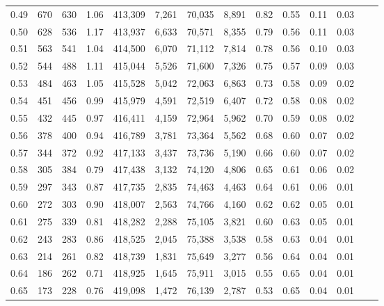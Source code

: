 \begin{tabular}{rrrrrrrrrrrrrr}
0.49 &     670 &    630 &    1.06 &  413,309 &    7,261 &  70,035 &   8,891 &  0.82 &  0.55 &  0.11 &      0.03 \\
0.50 &     628 &    536 &    1.17 &  413,937 &    6,633 &  70,571 &   8,355 &  0.79 &  0.56 &  0.11 &      0.03 \\
0.51 &     563 &    541 &    1.04 &  414,500 &    6,070 &  71,112 &   7,814 &  0.78 &  0.56 &  0.10 &      0.03 \\
0.52 &     544 &    488 &    1.11 &  415,044 &    5,526 &  71,600 &   7,326 &  0.75 &  0.57 &  0.09 &      0.03 \\
0.53 &     484 &    463 &    1.05 &  415,528 &    5,042 &  72,063 &   6,863 &  0.73 &  0.58 &  0.09 &      0.02 \\
0.54 &     451 &    456 &    0.99 &  415,979 &    4,591 &  72,519 &   6,407 &  0.72 &  0.58 &  0.08 &      0.02 \\
0.55 &     432 &    445 &    0.97 &  416,411 &    4,159 &  72,964 &   5,962 &  0.70 &  0.59 &  0.08 &      0.02 \\
0.56 &     378 &    400 &    0.94 &  416,789 &    3,781 &  73,364 &   5,562 &  0.68 &  0.60 &  0.07 &      0.02 \\
0.57 &     344 &    372 &    0.92 &  417,133 &    3,437 &  73,736 &   5,190 &  0.66 &  0.60 &  0.07 &      0.02 \\
0.58 &     305 &    384 &    0.79 &  417,438 &    3,132 &  74,120 &   4,806 &  0.65 &  0.61 &  0.06 &      0.02 \\
0.59 &     297 &    343 &    0.87 &  417,735 &    2,835 &  74,463 &   4,463 &  0.64 &  0.61 &  0.06 &      0.01 \\
0.60 &     272 &    303 &    0.90 &  418,007 &    2,563 &  74,766 &   4,160 &  0.62 &  0.62 &  0.05 &      0.01 \\
0.61 &     275 &    339 &    0.81 &  418,282 &    2,288 &  75,105 &   3,821 &  0.60 &  0.63 &  0.05 &      0.01 \\
0.62 &     243 &    283 &    0.86 &  418,525 &    2,045 &  75,388 &   3,538 &  0.58 &  0.63 &  0.04 &      0.01 \\
0.63 &     214 &    261 &    0.82 &  418,739 &    1,831 &  75,649 &   3,277 &  0.56 &  0.64 &  0.04 &      0.01 \\
0.64 &     186 &    262 &    0.71 &  418,925 &    1,645 &  75,911 &   3,015 &  0.55 &  0.65 &  0.04 &      0.01 \\
0.65 &     173 &    228 &    0.76 &  419,098 &    1,472 &  76,139 &   2,787 &  0.53 &  0.65 &  0.04 &      0.01 \\

\end{tabular}
